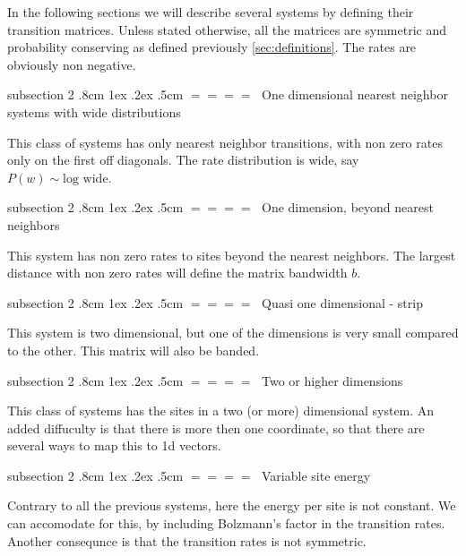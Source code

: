 \documentclass[onecolumn,fleqn,notitlepage,secnumarabic]{revtex4}
\makeatletter
\def\subsection{%
  \@startsection
    {subsection}%
    {2}%
    {\z@}%
    {.8cm \@plus1ex \@minus .2ex}%
    {.5cm}%
    {\normalfont\small\bfseries$=\!=\!=\!=\;$}%
}%
\makeatother
\begin{document}
In the following sections we will describe several systems by defining their transition matrices. Unless stated otherwise, all the matrices are symmetric and probability conserving as defined previously \ref{sec:definitions}. The rates are obviously non negative.

\subsection{One dimensional nearest neighbor systems with wide distributions}

This class of systems has only nearest neighbor transitions, with non zero rates only on the first off diagonals. The rate distribution is wide, say $P(w) \sim \textrm{log wide}$.

\subsection{One dimension, beyond nearest neighbors}

This system has non zero rates to sites beyond the nearest neighbors. The largest distance with non zero rates will define the matrix bandwidth $b$.

\subsection{Quasi one dimensional - strip}

This system is two dimensional, but one of the dimensions is very small compared to the other. This matrix will also be banded.

\subsection{Two or higher dimensions}

This class of systems has the sites in a two (or more) dimensional system. An added diffuculty is that there is more then one coordinate, so that there are several ways to map this to 1d vectors.

\subsection{Variable site energy}

Contrary to all the previous systems, here the energy per site is not constant. We can \cite{Ambegaokar:1971} accomodate for this, by including Bolzmann's factor in the transition rates. Another consequnce is that the transition rates is not symmetric.
\end{document}
